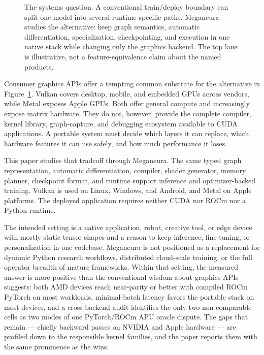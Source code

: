 \documentclass[10pt,twocolumn]{article}
\newcommand{\system}{Meganeura}
\begin{document}
\begin{figure}[t]
{%
}
\caption{The systems question. A conventional train/deploy boundary can split
one model into several runtime-specific paths. \system{} studies the
alternative: keep graph semantics, automatic differentiation, specialization,
checkpointing, and execution in one native stack while changing only the
graphics backend. The top lane is illustrative, not a feature-equivalence
claim about the named products.}
\label{fig:fragmentation}
\end{figure}

Consumer graphics APIs offer a tempting common substrate for the alternative
in Figure~\ref{fig:fragmentation}. Vulkan covers desktop, mobile, and embedded
GPUs across vendors, while Metal exposes Apple GPUs. Both offer general
compute and increasingly expose matrix hardware. They do not, however,
provide the complete compiler, kernel library, graph-capture, and debugging
ecosystem available to CUDA applications. A portable system must decide which
layers it can replace, which hardware features it can use safely, and how much
performance it loses.

This paper studies that tradeoff through \system{}. The same typed graph
representation, automatic differentiation, compiler, shader generator, memory
planner, checkpoint format, and runtime support inference and
optimizer-backed training. Vulkan is used on Linux, Windows, and Android, and
Metal on Apple platforms. The deployed application requires neither CUDA nor
ROCm nor a Python runtime.

The intended setting is a native application, robot, creative tool, or edge
device with mostly static tensor shapes and a reason to keep inference,
fine-tuning, or personalization in one codebase. \system{} is not positioned
as a replacement for dynamic Python research workflows, distributed
cloud-scale training, or the full operator breadth of mature frameworks.
Within that setting, the measured answer is more positive than the
conventional wisdom about graphics APIs suggests: both AMD devices reach
near-parity or better with compiled ROCm PyTorch on most workloads,
minimal-batch latency favors the portable stack on most devices, and a
cross-backend audit identifies the only two non-comparable cells as two modes
of one PyTorch/ROCm APU oracle dispute. The gaps that
remain --- chiefly backward passes on NVIDIA and Apple hardware --- are
profiled down to the responsible kernel families, and the paper reports
them with the same prominence as the wins.
\end{document}
